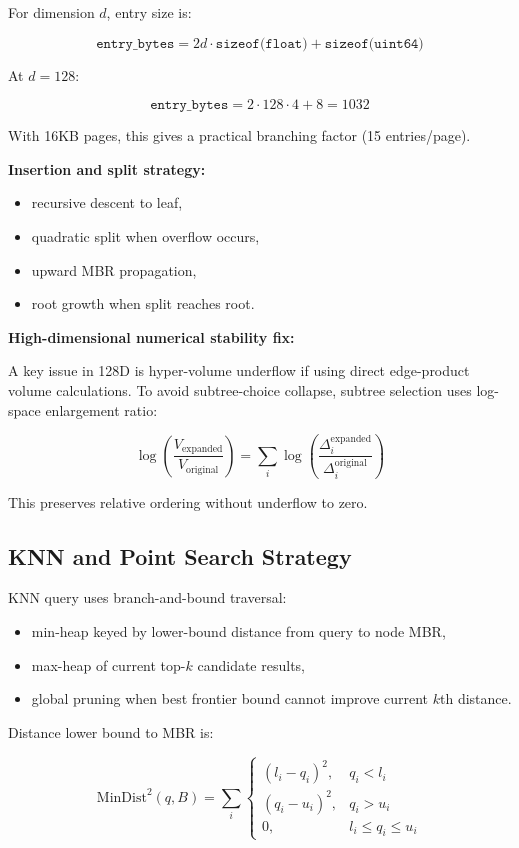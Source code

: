 \documentclass[11pt,a4paper]{article}
\begin{document}
For dimension $d$, entry size is:

\[
\texttt{entry\_bytes} = 2d \cdot \texttt{sizeof(float)} + \texttt{sizeof(uint64)}
\]

At $d=128$:

\[
\texttt{entry\_bytes} = 2 \cdot 128 \cdot 4 + 8 = 1032
\]

With 16KB pages, this gives a practical branching factor (15 entries/page).

\textbf{Insertion and split strategy:}

\begin{itemize}[leftmargin=1.5em]
  \item recursive descent to leaf,
  \item quadratic split when overflow occurs,
  \item upward MBR propagation,
  \item root growth when split reaches root.
\end{itemize}

\textbf{High-dimensional numerical stability fix:}

A key issue in 128D is hyper-volume underflow if using direct edge-product volume calculations. To avoid subtree-choice collapse, subtree selection uses log-space enlargement ratio:

\[
\log\left(\frac{V_{\text{expanded}}}{V_{\text{original}}}\right)
= \sum_i \log\left(\frac{\Delta_i^{\text{expanded}}}{\Delta_i^{\text{original}}}\right)
\]

This preserves relative ordering without underflow to zero.

\subsection{KNN and Point Search Strategy}

KNN query uses branch-and-bound traversal:

\begin{itemize}[leftmargin=1.5em]
  \item min-heap keyed by lower-bound distance from query to node MBR,
  \item max-heap of current top-$k$ candidate results,
  \item global pruning when best frontier bound cannot improve current $k$th distance.
\end{itemize}

Distance lower bound to MBR is:

\[
\text{MinDist}^2(q, B) = \sum_i
\begin{cases}
(l_i - q_i)^2, & q_i < l_i \\
(q_i - u_i)^2, & q_i > u_i \\
0, & l_i \le q_i \le u_i
\end{cases}
\]
\end{document}
